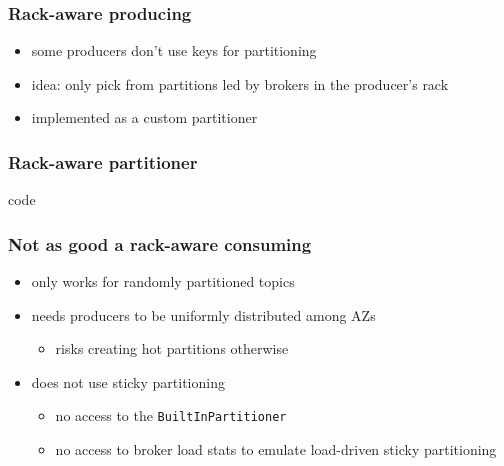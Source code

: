 \documentclass{beamer}
\newlength{\wideitemsep}
\let\olditem\item
\renewcommand{\item}{\setlength{\itemsep}{\wideitemsep}\olditem}
\begin{document}
\begin{frame}
  \frametitle{Rack-aware producing}

  \begin{itemize}
  \item some producers \alert{don't use keys} for partitioning
  \item idea: \alert{only pick} from partitions led by brokers in the \alert{producer's rack}
  \item implemented as a \alert{custom partitioner}
  \end{itemize}
\end{frame}

\begin{frame}
  \frametitle{Rack-aware partitioner}

  \begin{beamercolorbox}[sep=1em]{code}
    
  \end{beamercolorbox}
\end{frame}

\begin{frame}
  \frametitle{Not as good a rack-aware consuming}

  \begin{itemize}
  \item only works for \alert{randomly} partitioned topics
  \item needs producers to be \alert{uniformly} distributed among AZs
    \begin{itemize}
    \item risks creating hot partitions otherwise
    \end{itemize}
  \item does not use \alert{sticky partitioning}
    \begin{itemize}
    \item no access to the \texttt{BuiltInPartitioner}
    \item no access to broker load stats to emulate load-driven sticky partitioning
    \end{itemize}
  \end{itemize}
\end{frame}
\end{document}
